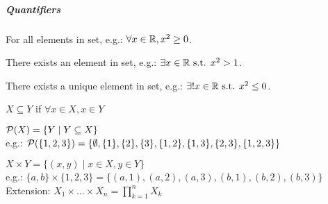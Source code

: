 \subparagraph{Quantifiers}
\begin{notation}[$\forall$]
	For all elements in set, e.g.: $\forall x \in \mathbb{R}, x^2 \geq 0$.
\end{notation}
\begin{notation}[$\exists$]
	There exists an element in set, e.g.: $\exists x \in \mathbb{R} \text{ s.t. } x^2 > 1$.
\end{notation}
\begin{notation}[$\exists !$]
	There exists a unique element in set, e.g.: $\exists ! x \in \mathbb{R} \text{ s.t. } x^2 \leq 0$.
\end{notation}
\begin{definition}
	$X \subseteq Y$ if $\forall x \in X, x \in Y$
\end{definition}
\begin{definition}[Powerset]
	$\mathcal{P}(X) = \{ Y \mid Y \subseteq X \}$\\
	e.g.: $\mathcal{P}(\{1,2,3\})=\{ \emptyset, \{1\},\{2\},\{3\}, \{1,2\},\{1,3\},\{2,3\}, \{1,2,3\} \}$
\end{definition}
\begin{definition}
	$X \times Y = \{ (x,y) \mid x \in X, y \in Y \}$\\
	e.g.: $\{a,b\} \times \{1,2,3\} = \{ (a,1),(a,2),(a,3), (b,1),(b,2),(b,3) \}$\\
	Extension: $X_1 \times \dots \times X_n = \prod_{k=1}^n X_k$
\end{definition}



